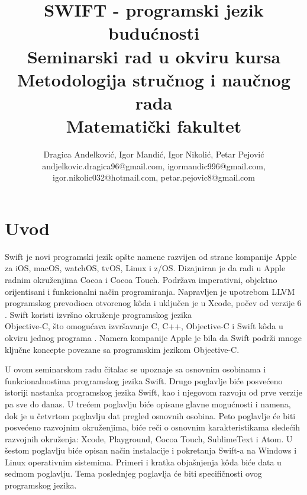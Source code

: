 \documentclass[a4paper]{article}
\begin{document}
\title{SWIFT - programski jezik budućnosti\\ \small{Seminarski rad u okviru kursa\\Metodologija stručnog i naučnog rada\\ Matematički fakultet}}

\author{Dragica Anđelković, Igor Mandić, Igor Nikolić, Petar Pejović\\ andjelkovic.dragica96@gmail.com,  igormandic996@gmail.com, \\ igor.nikolic032@hotmail.com, petar.pejovic8@gmail.com}


\maketitle



\tableofcontents

\newpage

\section{Uvod}
\label{sec:prviDeo}
Swift je novi programski jezik opšte namene razvijen od strane kompanije Apple za iOS, macOS, watchOS, tvOS, Linux i z/OS. Dizajniran je da radi u Apple radnim okruženjima Cocoa i Cocoa Touch. Podržava imperativni, objektno orijentisani i funkcionalni način programiranja. Napravljen je upotrebom LLVM programskog prevodioca otvorenog k\^{o}da i uključen je u Xcode, počev od verzije 6 \cite{swift_sajt}. Swift koristi izvršno okruženje programskog jezika \\
Objective-C, što omogućava izvršavanje C, C++, Objective-C i Swift k\^{o}da u okviru jednog programa \cite{arc_sajt}.
Namera kompanije Apple je bila da Swift podrži mnoge ključne koncepte povezane sa programskim jezikom Objective-C.

U ovom seminarskom radu čitalac se upoznaje sa osnovnim osobinama i funkcionalnostima programskog jezika Swift. Drugo poglavlje biće posvećeno istoriji nastanka programskog jezika Swift, kao i njegovom razvoju od prve verzije pa sve do danas. U trećem poglavlju biće opisane glavne mogućnosti i namena, dok je u četvrtom poglavlju dat pregled osnovnih osobina. Peto poglavlje će biti posvećeno razvojnim okruženjima, biće reči o osnovnim karakteristikama sledećih razvojnih okruženja: Xcode, Playground, Cocoa Touch, SublimeText i Atom. U šestom poglavlju biće opisan način instalacije i pokretanja Swift-a na Windows i Linux operativnim sistemima. Primeri i kratka objašnjenja k\^{o}da biće data u sedmom poglavlju. Tema poslednjeg poglavlja će biti specifičnosti ovog programskog jezika.
\end{document}
